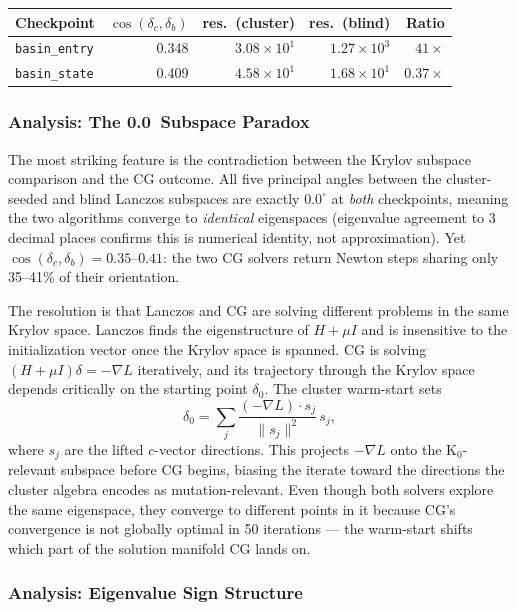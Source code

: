 \documentclass[11pt]{amsart}
\begin{document}
\begin{center}
\small
\begin{tabular}{@{}lrrrr@{}}
\toprule
Checkpoint
  & $\cos(\delta_c,\delta_b)$
  & res.\ (cluster)
  & res.\ (blind)
  & Ratio \\
\midrule
\texttt{basin\_entry} & 0.348 & $3.08\times10^{1}$ & $1.27\times10^{3}$ & $41\times$ \\
\texttt{basin\_state} & 0.409 & $4.58\times10^{1}$ & $1.68\times10^{1}$ & $0.37\times$ \\
\bottomrule
\end{tabular}
\end{center}

\subsubsection*{Analysis: The 0.0\textdegree\ Subspace Paradox}

The most striking feature is the contradiction between the Krylov
subspace comparison and the CG outcome.
All five principal angles between the cluster-seeded and blind Lanczos
subspaces are exactly $0.0^\circ$ at \emph{both} checkpoints,
meaning the two algorithms converge to \emph{identical} eigenspaces
(eigenvalue agreement to 3 decimal places confirms this is numerical
identity, not approximation).
Yet $\cos(\delta_c, \delta_b) = 0.35$--$0.41$: the two CG solvers
return Newton steps sharing only 35--41\% of their orientation.

The resolution is that Lanczos and CG are solving different problems
in the same Krylov space.
Lanczos finds the eigenstructure of $H + \mu I$ and is insensitive
to the initialization vector once the Krylov space is spanned.
CG is solving $(H + \mu I)\delta = -\nabla L$ iteratively,
and its trajectory through the Krylov space depends critically on
the starting point $\delta_0$.
The cluster warm-start sets
\[
  \delta_0 = \sum_j \frac{(-\nabla L) \cdot s_j}{\|s_j\|^2}\, s_j,
\]
where $s_j$ are the lifted $c$-vector directions.
This projects $-\nabla L$ onto the K$_0$-relevant subspace before
CG begins, biasing the iterate toward the directions the cluster
algebra encodes as mutation-relevant.
Even though both solvers explore the same eigenspace, they converge to
different points in it because CG's convergence is not globally optimal
in 50 iterations --- the warm-start shifts which part of the solution
manifold CG lands on.

\subsubsection*{Analysis: Eigenvalue Sign Structure}
\end{document}
